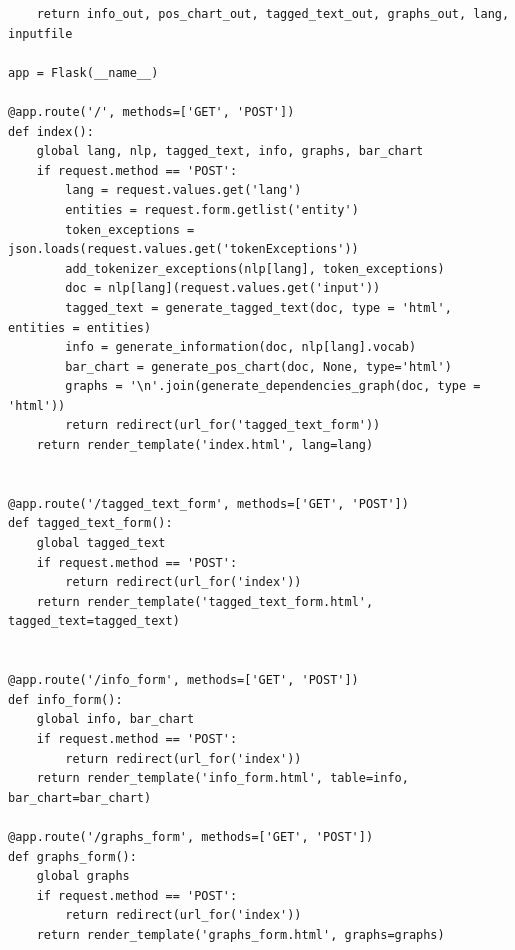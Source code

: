 \documentclass[12pt]{article}
\begin{document}
\begin{verbatim}
    return info_out, pos_chart_out, tagged_text_out, graphs_out, lang, inputfile

app = Flask(__name__)

@app.route('/', methods=['GET', 'POST'])
def index():
    global lang, nlp, tagged_text, info, graphs, bar_chart
    if request.method == 'POST':
        lang = request.values.get('lang')
        entities = request.form.getlist('entity')
        token_exceptions = json.loads(request.values.get('tokenExceptions'))
        add_tokenizer_exceptions(nlp[lang], token_exceptions)
        doc = nlp[lang](request.values.get('input'))
        tagged_text = generate_tagged_text(doc, type = 'html', entities = entities)
        info = generate_information(doc, nlp[lang].vocab)
        bar_chart = generate_pos_chart(doc, None, type='html')
        graphs = '\n'.join(generate_dependencies_graph(doc, type = 'html'))
        return redirect(url_for('tagged_text_form'))
    return render_template('index.html', lang=lang)


@app.route('/tagged_text_form', methods=['GET', 'POST'])
def tagged_text_form():
    global tagged_text
    if request.method == 'POST':
        return redirect(url_for('index'))
    return render_template('tagged_text_form.html', tagged_text=tagged_text)


@app.route('/info_form', methods=['GET', 'POST'])
def info_form():
    global info, bar_chart
    if request.method == 'POST':
        return redirect(url_for('index'))
    return render_template('info_form.html', table=info, bar_chart=bar_chart)

@app.route('/graphs_form', methods=['GET', 'POST'])
def graphs_form():
    global graphs
    if request.method == 'POST':
        return redirect(url_for('index'))
    return render_template('graphs_form.html', graphs=graphs)



\end{verbatim}
\end{document}
